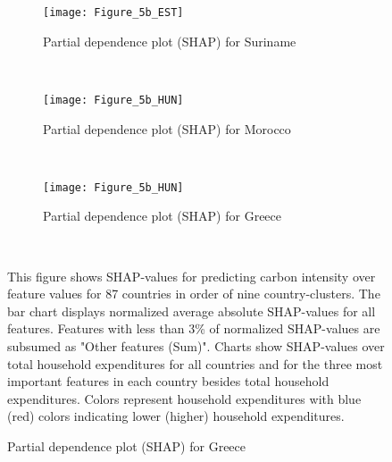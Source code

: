 \begin{figure}[ht!]\ContinuedFloat
    \centering
   \begin{subfigure}[b]{\textwidth}
         \centering
         \caption{Partial dependence plot (SHAP) for Suriname}
         \label{fig:5b_SUR}
         \texttt{[image: Figure\_5b\_EST]}         
     \end{subfigure}
    \\
    \vspace{0.5cm}
   \begin{subfigure}[b]{\textwidth}
         \centering
         \caption{Partial dependence plot (SHAP) for Morocco}
         \label{fig:5b_MAR}
         \texttt{[image: Figure\_5b\_HUN]}         
     \end{subfigure}
    \\
    \vspace{0.5cm}
   \begin{subfigure}[b]{\textwidth}
         \centering
         \caption{Partial dependence plot (SHAP) for Greece}
         \label{fig:5b_GRC}
         \texttt{[image: Figure\_5b\_HUN]}
    \end{subfigure}
    \\
    \vspace{0.5cm}
    \begin{subcaption2}
     This figure shows SHAP-values for predicting carbon intensity over feature values for 87 countries in order of nine country-clusters. The bar chart displays normalized average absolute SHAP-values for all features. Features with less than 3\% of normalized SHAP-values are subsumed as "Other features (Sum)". Charts show SHAP-values over total household expenditures for all countries and for the three most important features in each country besides total household expenditures. Colors represent household expenditures with blue (red) colors indicating lower (higher) household expenditures.
     \end{subcaption2}
\end{figure}


